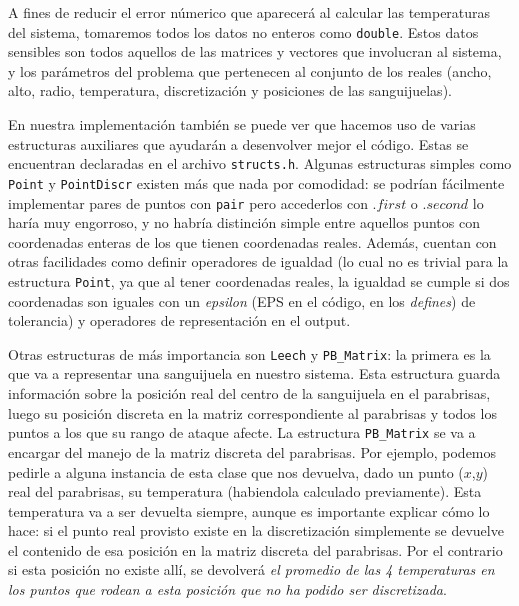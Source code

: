 A fines de reducir el error númerico que aparecerá al calcular las temperaturas del sistema, tomaremos todos los datos no enteros como \texttt{double}. Estos datos sensibles son todos aquellos de las matrices y vectores que involucran al sistema, y los parámetros del problema que pertenecen al conjunto de los reales (ancho, alto, radio, temperatura, discretización y posiciones de las sanguijuelas).

\vspace{\baselineskip}

En nuestra implementación también se puede ver que hacemos uso de varias estructuras auxiliares que ayudarán a desenvolver mejor el código. Estas se encuentran declaradas en el archivo \texttt{structs.h}. Algunas estructuras simples como \texttt{Point} y \texttt{PointDiscr} existen más que nada por comodidad: se podrían fácilmente implementar pares de puntos con \texttt{pair} pero accederlos con $.first$ o $.second$ lo haría muy engorroso, y no habría distinción simple entre aquellos puntos con coordenadas enteras de los que tienen coordenadas reales. Además, cuentan con otras facilidades como definir operadores de igualdad (lo cual no es trivial para la estructura \texttt{Point}, ya que al tener coordenadas reales, la igualdad se cumple si dos coordenadas son iguales con un \textit{epsilon} (EPS en el código, en los \textit{defines}) de tolerancia) y operadores de representación en el output.

Otras estructuras de más importancia son \texttt{Leech} y \texttt{PB\_Matrix}: la primera es la que va a representar una sanguijuela en nuestro sistema. Esta estructura guarda información sobre la posición real del centro de la sanguijuela en el parabrisas, luego su posición discreta en la matriz correspondiente al parabrisas y todos los puntos a los que su rango de ataque afecte. La estructura \texttt{PB\_Matrix} se va a encargar del manejo de la matriz discreta del parabrisas. Por ejemplo, podemos pedirle a alguna instancia de esta clase que nos devuelva, dado un punto ($x$,$y$) real del parabrisas, su temperatura (habiendola calculado previamente). Esta temperatura va a ser devuelta siempre, aunque es importante explicar cómo lo hace: si el punto real provisto existe en la discretización simplemente se devuelve el contenido de esa posición en la matriz discreta del parabrisas. Por el contrario si esta posición no existe allí, se devolverá \textit{el promedio de las 4 temperaturas en los puntos que rodean a esta posición que no ha podido ser discretizada}.

